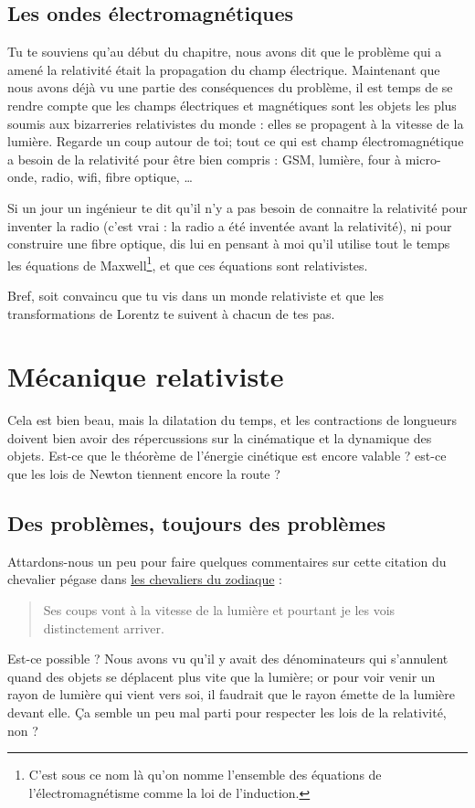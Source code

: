 \subsection{Les ondes électromagnétiques}

Tu te souviens qu'au début du chapitre, nous avons dit que le problème qui a amené la relativité était la propagation du champ électrique. Maintenant que nous avons déjà vu une partie des conséquences du problème, il est temps de se rendre compte que les champs électriques et magnétiques sont les objets les plus soumis aux bizarreries relativistes du monde : elles se propagent à la vitesse de la lumière. Regarde un coup autour de toi; tout ce qui est champ électromagnétique a besoin de la relativité pour être bien compris : GSM, lumière, four à micro-onde, radio, wifi, fibre optique, \ldots

Si un jour un ingénieur te dit qu'il n'y a pas besoin de connaitre la relativité pour inventer la radio (c'est vrai : la radio a été inventée avant la relativité), ni pour construire une fibre optique, dis lui en pensant à moi qu'il utilise tout le temps les équations de Maxwell\footnote{C'est sous ce nom là qu'on nomme l'ensemble des équations de l'électromagnétisme comme la loi de l'induction.}, et que ces équations sont relativistes.

Bref, soit convaincu que tu vis dans un monde relativiste et que les transformations de Lorentz te suivent à chacun de tes pas.

\section{Mécanique relativiste}

Cela est bien beau, mais la dilatation du temps, et les contractions de longueurs doivent bien avoir des répercussions sur la cinématique et la dynamique des objets. Est-ce que le théorème de l'énergie cinétique est encore valable ? est-ce que les lois de Newton tiennent encore la route ?


\subsection{Des problèmes, toujours des problèmes}


Attardons-nous un peu pour faire quelques commentaires sur cette citation du chevalier pégase dans \href{http://fr.wikipedia.org/wiki/Les_Chevaliers_du_Zodiaque}{les chevaliers du zodiaque} :
\begin{quote}
	Ses coups vont à la vitesse de la lumière et pourtant je les vois distinctement arriver.
\end{quote}
Est-ce possible ? Nous avons vu qu'il y avait des dénominateurs qui s'annulent quand des objets se déplacent plus vite que la lumière; or pour voir venir un rayon de lumière qui vient vers soi, il faudrait que le rayon émette de la lumière devant elle. Ça semble un peu mal parti pour respecter les lois de la relativité, non ?

